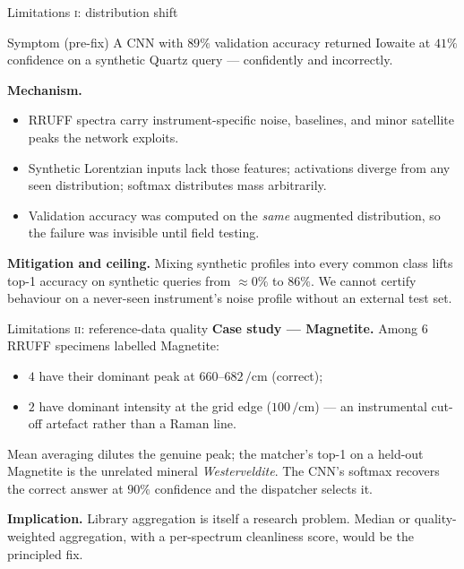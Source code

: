 \documentclass[10pt,aspectratio=169,xcolor=dvipsnames]{beamer}
\newcommand{\cmone}{\si{\per\centi\meter}}
\begin{document}
\begin{frame}{Limitations \textsc{i}: distribution shift}
  \begin{exampleblock}{Symptom (pre-fix)}
    A CNN with $89\%$ validation accuracy returned \alert{Iowaite at $41\%$}
    confidence on a synthetic Quartz query — confidently and incorrectly.
  \end{exampleblock}
  \medskip
  \textbf{Mechanism.}
  \begin{itemize}\setlength\itemsep{0.2em}
    \item RRUFF spectra carry instrument-specific noise, baselines, and minor
          satellite peaks the network exploits.
    \item Synthetic Lorentzian inputs lack those features; activations diverge
          from any seen distribution; softmax distributes mass arbitrarily.
    \item Validation accuracy was computed on the \emph{same} augmented
          distribution, so the failure was invisible until field testing.
  \end{itemize}
  \medskip
  \textbf{Mitigation and ceiling.} Mixing synthetic profiles into every common
  class lifts top-1 accuracy on synthetic queries from $\approx 0\%$ to $86\%$.
  We \alert{cannot} certify behaviour on a never-seen instrument's noise
  profile without an external test set.
\end{frame}

\begin{frame}{Limitations \textsc{ii}: reference-data quality}
  \textbf{Case study — Magnetite.} Among $6$ RRUFF specimens labelled
  Magnetite:
  \begin{itemize}
    \item $4$ have their dominant peak at $660$–$682\,\cmone$ (correct);
    \item $2$ have dominant intensity at the grid edge ($100\,\cmone$) —
          an instrumental cut-off artefact rather than a Raman line.
  \end{itemize}
  \medskip
  Mean averaging dilutes the genuine peak; the matcher's top-1 on a
  held-out Magnetite is the unrelated mineral \emph{Westerveldite}.
  The CNN's softmax recovers the correct answer at $90\%$ confidence and
  the dispatcher selects it.
  \medskip

  \textbf{Implication.} Library aggregation is itself a research problem.
  Median or quality-weighted aggregation, with a per-spectrum cleanliness
  score, would be the principled fix.
\end{frame}
\end{document}
